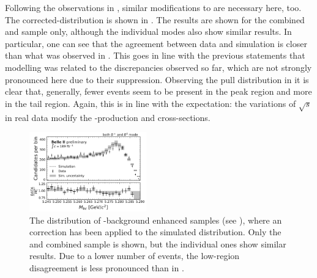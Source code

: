 Following the observations in , similar modifications to \Mbc are necessary here, too.
The corrected-\Mbc distribution is shown in .
The results are shown for the combined \feiBp and \feiBz sample only, although the individual \FEI modes also show similar results.
In particular, one can see that the agreement between data and simulation is closer than what was observed in .
This goes in line with the previous statements that \epem\ra\qqbar modelling was related to the discrepancies observed so far, which are not strongly pronounced here due to their suppression.
Observing the pull distribution in  it is clear that, generally, fewer events seem to be present in the peak region and more in the tail region.
Again, this is in line with the expectation: the variations of $\sqrt{s}$ in real data modify the \BB-production and \epem\ra\qqbar cross-sections.
\begin{figure}[htbp!]
    \centering
    \includegraphics[width=0.45\textwidth]{figures/data_validation/Bboth_bbbar_enhanced_mbccorrected.pdf}
    \caption{\label{fig:bbbar_enhanced_mbccorrected} The \Mbc distribution of \BB-background enhanced samples (see ),
    where an \Mbc correction has been applied to the simulated distribution.
    Only the \feiBp and \feiBz combined sample is shown, but the individual ones show similar results.
    Due to a lower number of \epem\ra\qqbar events, the low-\Mbc region disagreement is less pronounced than in .
    }
\end{figure}

